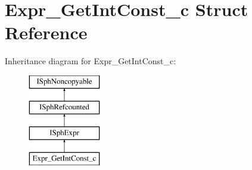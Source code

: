 \hypertarget{structExpr__GetIntConst__c}{\section{Expr\-\_\-\-Get\-Int\-Const\-\_\-c Struct Reference}
\label{structExpr__GetIntConst__c}
}
Inheritance diagram for Expr\-\_\-\-Get\-Int\-Const\-\_\-c\-:\begin{figure}[H]
\begin{center}
\leavevmode
\includegraphics[height=4.000000cm]{structExpr__GetIntConst__c}
\end{center}
\end{figure}
